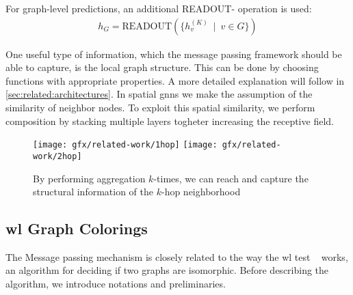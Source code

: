 For graph-level predictions, an additional READOUT- operation is used:
\begin{align*}
    h_{G} =\mathrm{READOUT}(\{h_{v}^{(K)}\ \mid \ v \in G\})
\end{align*}

One useful type of information, which the message passing framework should be able to
capture, is the local graph structure. This can be done by choosing functions with
appropriate properties. A more detailed explanation will follow in
\cref{sec:related:architectures}. In spatial \acp{gnn} we make the assumption of the
similarity of neighbor nodes. To exploit this spatial similarity, we perform
composition by stacking multiple layers togheter increasing the receptive field.

\begin{figure}[ht]
    \centering
    \texttt{[image: gfx/related-work/1hop]}\hspace{1cm}
    \texttt{[image: gfx/related-work/2hop]}
    \caption{By performing aggregation $k$-times, we can reach and capture the
        structural information of the $k$-hop neighborhood}\label{fig:related:1hop}
\end{figure}


\subsection{\acl{wl} Graph Colorings}
\label{sec:related:character:wl}
The Message passing mechanism is closely related to the way the \acf{wl} test ~\cite{Weisfeiler1968,Damke2020,Huang2022} works, an algorithm for deciding if two graphs are isomorphic.
Before describing the algorithm, we introduce notations and preliminaries.\\

